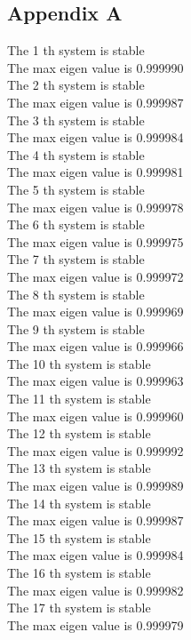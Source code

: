 \documentclass[11pt]{article}
\begin{document}
\subsection{Appendix A}
\label{sec:org5ab6351}
The 1 th system is stable \\
The max eigen value is 0.999990 \\
The 2 th system is stable \\
The max eigen value is 0.999987 \\
The 3 th system is stable \\
The max eigen value is 0.999984 \\
The 4 th system is stable \\
The max eigen value is 0.999981 \\
The 5 th system is stable \\
The max eigen value is 0.999978 \\
The 6 th system is stable \\
The max eigen value is 0.999975 \\
The 7 th system is stable \\
The max eigen value is 0.999972 \\
The 8 th system is stable \\
The max eigen value is 0.999969 \\
The 9 th system is stable \\
The max eigen value is 0.999966 \\
The 10 th system is stable \\
The max eigen value is 0.999963 \\
The 11 th system is stable \\
The max eigen value is 0.999960 \\
The 12 th system is stable \\
The max eigen value is 0.999992 \\
The 13 th system is stable \\
The max eigen value is 0.999989 \\
The 14 th system is stable \\
The max eigen value is 0.999987 \\
The 15 th system is stable \\
The max eigen value is 0.999984 \\
The 16 th system is stable \\
The max eigen value is 0.999982 \\
The 17 th system is stable \\
The max eigen value is 0.999979 \\
\end{document}
